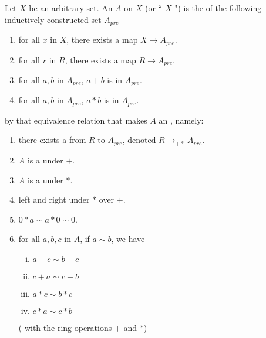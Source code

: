 \begin{definition}
    \label{FreeAlgebra}
    \leanok

    Let $X$ be an arbitrary set.
    An  $A$ on $X$ (or `` $X$ ") is the  of the following inductively constructed set $A_{pre}$

    \begin{enumerate}

    \item for all $x$ in $X$, there exists a map $X \to A_{pre}$.
    \item for all $r$ in $R$, there exists a map $R \to A_{pre}$.
    \item for all $a, b$ in $A_{pre}$, $a + b$ is in $A_{pre}$.
    \item for all $a, b$ in $A_{pre}$, $a * b$ is in $A_{pre}$.
    
    \end{enumerate}

    by that equivalence relation that makes $A$ an , namely:

    \begin{enumerate}
    
    \item there exists a  from $R$ to $A_{pre}$, denoted $R \to_{+*} A_{pre}$.
    \item $A$ is a  under $+$.
    \item $A$ is a  under $*$.
    \item left and right  under $*$ over $+$.
    \item $0 * a \sim a * 0 \sim 0$.
    \item for all $a, b, c$ in $A$, if $a \sim b$, we have
    
    \begin{enumerate}[(i)]
    
    \item $a + c \sim b + c$
    \item $c + a \sim c + b$
    \item $a * c \sim b * c$
    \item $c * a \sim c * b$

    \end{enumerate}

    ( with the ring operations $+$ and $*$)

    \end{enumerate}

\end{definition}

